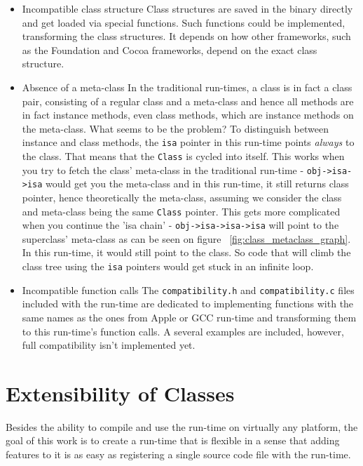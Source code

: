 \begin{itemize}
  \item{Incompatible class structure} Class structures are saved in the binary directly and get loaded via special functions. Such functions could be implemented, transforming the class structures. It depends on how other frameworks, such as the Foundation and Cocoa frameworks, depend on the exact class structure.
  \item{Absence of a meta-class} In the traditional run-times, a class is in fact a class pair, consisting of a regular class and a meta-class and hence all methods are in fact instance methods, even class methods, which are instance methods on the meta-class. What seems to be the problem? To distinguish between instance and class methods, the \verb=isa= pointer in this run-time points \emph{always} to the class. That means that the \verb=Class= is cycled into itself. This works when you try to fetch the class' meta-class in the traditional run-time - \verb=obj->isa->isa= would get you the meta-class and in this run-time, it still returns class pointer, hence theoretically the meta-class, assuming we consider the class and meta-class being the same \verb=Class= pointer. This gets more complicated when you continue the 'isa chain' - \verb=obj->isa->isa->isa= will point to the superclass' meta-class as can be seen on figure ~\ref{fig:class_metaclass_graph}. In this run-time, it would still point to the class. So code that will climb the class tree using the \verb=isa= pointers would get stuck in an infinite loop.
  \item{Incompatible function calls} The \verb=compatibility.h= and \verb=compatibility.c= files included with the run-time are dedicated to implementing functions with the same names as the ones from Apple or GCC run-time and transforming them to this run-time's function calls. A several examples are included, however, full compatibility isn't implemented yet.
\end{itemize}

\section{Extensibility of Classes}

Besides the ability to compile and use the run-time on virtually any platform, the goal of this work is to create a run-time that is flexible in a sense that adding features to it is as easy as registering a single source code file with the run-time.

